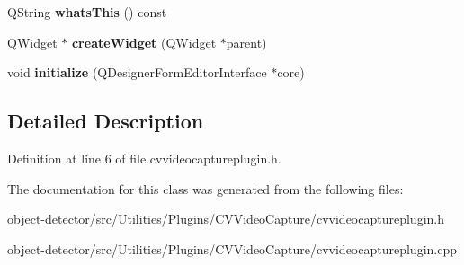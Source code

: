 \begin{DoxyCompactItemize}
Q\+String {\bfseries whats\+This} () const
\item 
\mbox{\label{class_c_v_video_capture_plugin_aedc98a9189f50fe51733824e3a9eb08d}} 
Q\+Widget $\ast$ {\bfseries create\+Widget} (Q\+Widget $\ast$parent)
\item 
\mbox{\label{class_c_v_video_capture_plugin_add4c2aa207924edc4e88e4b854f15c07}} 
void {\bfseries initialize} (Q\+Designer\+Form\+Editor\+Interface $\ast$core)
\end{DoxyCompactItemize}


\subsection{Detailed Description}


Definition at line 6 of file cvvideocaptureplugin.\+h.



The documentation for this class was generated from the following files\+:\begin{DoxyCompactItemize}
\item 
object-\/detector/src/\+Utilities/\+Plugins/\+C\+V\+Video\+Capture/cvvideocaptureplugin.\+h\item 
object-\/detector/src/\+Utilities/\+Plugins/\+C\+V\+Video\+Capture/cvvideocaptureplugin.\+cpp\end{DoxyCompactItemize}

